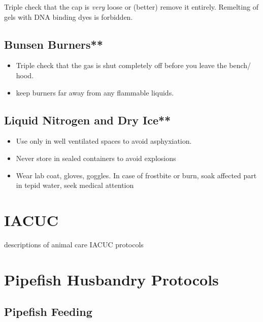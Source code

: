 \documentclass[
]{book}
\begin{document}
Triple check that the cap is \emph{very} loose or (better) remove it entirely. Remelting of gels with DNA binding dyes is forbidden.

\hypertarget{bunsen-burners}{%
\section{Bunsen Burners**}\label{bunsen-burners}}

\begin{itemize}
\item
  Triple check that the gas is shut completely off before you leave the bench/ hood.
\item
  keep burners far away from any flammable liquids.
\end{itemize}

\hypertarget{liquid-nitrogen-and-dry-ice}{%
\section{Liquid Nitrogen and Dry Ice**}\label{liquid-nitrogen-and-dry-ice}}

\begin{itemize}
\item
  Use only in well ventilated spaces to avoid asphyxiation.
\item
  Never store in sealed containers to avoid explosions
\item
  Wear lab coat, gloves, goggles. In case of frostbite or burn, soak affected part in tepid water, seek medical attention
\end{itemize}

\hypertarget{iacuc}{%
\chapter{IACUC}\label{iacuc}}

descriptions of animal care IACUC protocols

\hypertarget{pipefish-husbandry-protocols}{%
\chapter{Pipefish Husbandry Protocols}\label{pipefish-husbandry-protocols}}

\newpage

\hypertarget{pipefish-feeding}{%
\section{Pipefish Feeding}\label{pipefish-feeding}}
\end{document}

